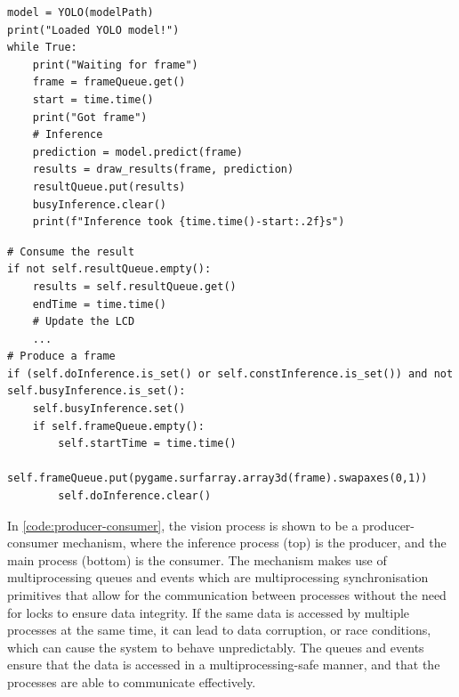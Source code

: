 \begin{minipage}[H]{\textwidth}
    \centering
    \begin{minipage}[H]{\textwidth}
    \centering
    \begin{verbatim}
model = YOLO(modelPath)
print("Loaded YOLO model!")
while True:
    print("Waiting for frame")
    frame = frameQueue.get()
    start = time.time()
    print("Got frame")
    # Inference
    prediction = model.predict(frame)
    results = draw_results(frame, prediction)
    resultQueue.put(results)
    busyInference.clear()
    print(f"Inference took {time.time()-start:.2f}s")
    \end{verbatim}
\end{minipage}
\begin{minipage}[H]{\textwidth}
    \centering
\begin{verbatim}
# Consume the result
if not self.resultQueue.empty():
    results = self.resultQueue.get()
    endTime = time.time()
    # Update the LCD
    ...
# Produce a frame
if (self.doInference.is_set() or self.constInference.is_set()) and not self.busyInference.is_set():
    self.busyInference.set()
    if self.frameQueue.empty():
        self.startTime = time.time()
        self.frameQueue.put(pygame.surfarray.array3d(frame).swapaxes(0,1))
        self.doInference.clear()
        \end{verbatim}
    \label{code:producer-consumer}
    \end{minipage}
\end{minipage}

In \autoref{code:producer-consumer}, the vision process is shown to be a producer-consumer mechanism, where the inference process (top) is the producer, and the main process (bottom) is the consumer. The mechanism makes use of multiprocessing queues and events which are multiprocessing synchronisation primitives that allow for the communication between processes without the need for locks to ensure data integrity. If the same data is accessed by multiple processes at the same time, it can lead to data corruption, or race conditions, which can cause the system to behave unpredictably. The queues and events ensure that the data is accessed in a multiprocessing-safe manner, and that the processes are able to communicate effectively.

